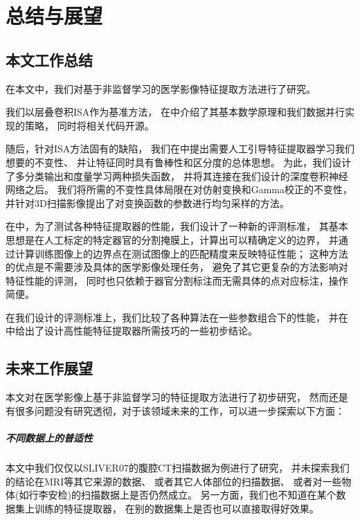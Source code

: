 
\chapter{总结与展望\label{chap:discuss}}

\section{本文工作总结}
在本文中，我们对基于非监督学习的医学影像特征提取方法进行了研究。

我们以层叠卷积ISA作为基准方法，
在中介绍了其基本数学原理和我们数据并行实现的策略，
同时将相关代码开源。

随后，针对ISA方法固有的缺陷，
我们在中提出需要人工引导特征提取器学习我们想要的不变性、
并让特征同时具有鲁棒性和区分度的总体思想。
为此，我们设计了多分类输出和度量学习两种损失函数，
并将其连接在我们设计的深度卷积神经网络之后。
我们将所需的不变性具体局限在对仿射变换和Gamma校正的不变性，
并针对3D扫描影像提出了对变换函数的参数进行均匀采样的方法。

在中，为了测试各种特征提取器的性能，我们设计了一种新的评测标准，
其基本思想是在人工标定的特定器官的分割掩膜上，计算出可以精确定义的边界，
并通过计算训练图像上的边界点在测试图像上的匹配精度来反映特征性能；
这种方法的优点是不需要涉及具体的医学影像处理任务，
避免了其它更复杂的方法影响对特征性能的评测，
同时也只依赖于器官分割标注而无需具体的点对应标注，操作简便。

在我们设计的评测标准上，我们比较了各种算法在一些参数组合下的性能，
并在中给出了设计高性能特征提取器所需技巧的一些初步结论。

\section{未来工作展望}
本文对在医学影像上基于非监督学习的特征提取方法进行了初步研究，
然而还是有很多问题没有研究透彻，对于该领域未来的工作，可以进一步探索以下方面：

\paragraph{不同数据上的普适性}
本文中我们仅仅以SLIVER07的腹腔CT扫描数据为例进行了研究，
并未探索我们的结论在MRI等其它来源的数据、
或者其它人体部位的扫描数据、
或者对一些物体(如行李安检)的扫描数据上是否仍然成立。
另一方面，我们也不知道在某个数据集上训练的特征提取器，
在别的数据集上是否也可以直接取得好效果。


